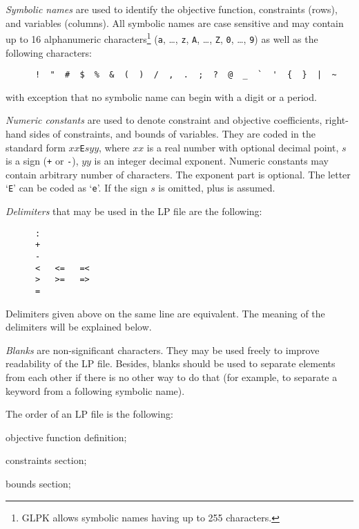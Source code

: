 \newpage

{\it Symbolic names} are used to identify the objective function,
constraints (rows), and variables (columns). All symbolic names are case
sensitive and may contain up to 16 alphanumeric characters\footnote{GLPK
allows symbolic names having up to 255 characters.} (\verb|a|, \dots,
\verb|z|, \verb|A|, \dots, \verb|Z|, \verb|0|, \dots, \verb|9|) as well
as the following characters:

\begin{verbatim}
      !  "  #  $  %  &  (  )  /  ,  .  ;  ?  @  _  `  '  {  }  |  ~
\end{verbatim}

\noindent
with exception that no symbolic name can begin with a digit or
a period.

{\it Numeric constants} are used to denote constraint and objective
coefficients, right-hand sides of constraints, and bounds of variables.
They are coded in the standard form $xx$\verb|E|$syy$, where $xx$ is
a real number with optional decimal point, $s$ is a sign (\verb|+| or
\verb|-|), $yy$ is an integer decimal exponent. Numeric constants may
contain arbitrary number of characters. The exponent part is optional.
The letter `\verb|E|' can be coded as `\verb|e|'. If the sign $s$ is
omitted, plus is assumed.

{\it Delimiters} that may be used in the LP file are the following:

\begin{verbatim}
      :
      +
      -
      <   <=   =<
      >   >=   =>
      =
\end{verbatim}

\noindent
Delimiters given above on the same line are equivalent. The meaning of
the delimiters will be explained below.

{\it Blanks} are non-significant characters. They may be used freely to
improve readability of the LP file. Besides, blanks should be used to
separate elements from each other if there is no other way to do that
(for example, to separate a keyword from a following symbolic name).

The order of an LP file is the following:


\Item{---}objective function definition;

\Item{---}constraints section;

\Item{---}bounds section;

